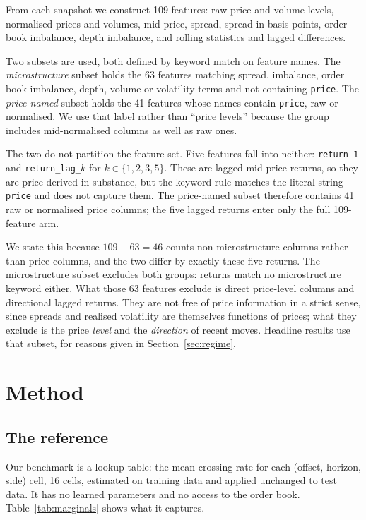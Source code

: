 \documentclass[11pt]{article}
\begin{document}
From each snapshot we construct 109 features: raw price and volume levels,
normalised prices and volumes, mid-price, spread, spread in basis points, order
book imbalance, depth imbalance, and rolling statistics and lagged differences.

Two subsets are used, both defined by keyword match on feature names. The
\emph{microstructure} subset holds the 63 features matching spread, imbalance,
order book imbalance, depth, volume or volatility terms and not containing
\texttt{price}. The \emph{price-named} subset holds the 41 features whose
names contain \texttt{price}, raw or normalised. We use that label rather than
``price levels'' because the group includes mid-normalised columns as well as
raw ones.

The two do not partition the feature set. Five features fall into neither:
\texttt{return\_1} and \texttt{return\_lag\_}$k$ for
$k \in \{1,2,3,5\}$. These are lagged mid-price returns, so they are
price-derived in substance, but the keyword rule matches the literal string
\texttt{price} and does not capture them. The price-named subset therefore
contains 41 raw or normalised price columns; the five lagged returns enter only
the full 109-feature arm.

We state this because $109 - 63 = 46$ counts non-microstructure columns rather
than price columns, and the two differ by exactly these five returns. The
microstructure subset excludes both groups: returns match no microstructure
keyword either. What those 63 features exclude is direct price-level columns
and directional lagged returns. They are not free of price information in a
strict sense, since spreads and realised volatility are themselves functions of
prices; what they exclude is the price \emph{level} and the \emph{direction} of
recent moves. Headline results use that subset, for reasons given in
Section~\ref{sec:regime}.

\section{Method}
\label{sec:method}

\subsection{The reference}

Our benchmark is a lookup table: the mean crossing rate for each
(offset, horizon, side) cell, 16 cells, estimated on training data and applied
unchanged to test data. It has no learned parameters and no access to the order
book. Table~\ref{tab:marginals} shows what it captures.
\end{document}
